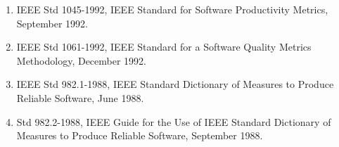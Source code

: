 \begin{enumerate}
    \item IEEE Std 1045-1992, IEEE Standard for Software Productivity Metrics, September 1992.
    \item IEEE Std 1061-1992, IEEE Standard for a Software Quality Metrics Methodology, December 1992.
    \item IEEE Std 982.1-1988, IEEE Standard Dictionary of Measures to Produce Reliable Software, June 1988.
    \item Std 982.2-1988, IEEE Guide for the Use of IEEE Standard Dictionary of Measures to Produce Reliable Software, September 1988.
\end{enumerate}

